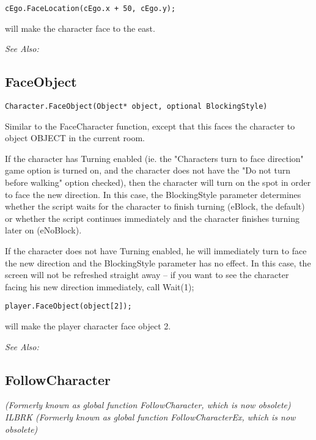 \begin{verbatim}
cEgo.FaceLocation(cEgo.x + 50, cEgo.y);
\end{verbatim}
will make the character face to the east.

\it{See Also:} 


\subsection{FaceObject}\label{Character.FaceObject}%

\begin{verbatim}
Character.FaceObject(Object* object, optional BlockingStyle)
\end{verbatim}
Similar to the FaceCharacter function, except that this faces the character
to object OBJECT in the current room.

If the character has Turning enabled (ie. the "Characters turn to face direction" game
option is turned on, and the character does not have the "Do not turn before walking"
option checked), then the character will turn on the spot in order to face the new direction.
In this case, the BlockingStyle parameter determines whether the script waits for the
character to finish turning (eBlock, the default) or whether the script continues immediately
and the character finishes turning later on (eNoBlock).

If the character does not have Turning enabled, he will immediately turn to face the
new direction and the BlockingStyle parameter has no effect. In this case, the screen
will not be refreshed straight away -- if you want to see the character facing his new direction
immediately, call  Wait(1);

\begin{verbatim}
player.FaceObject(object[2]);
\end{verbatim}
will make the player character face object 2.

\it{See Also:} 


\subsection{FollowCharacter}\label{Character.FollowCharacter}%

\it{(Formerly known as global function FollowCharacter, which is now obsolete)} ILBRK
\it{(Formerly known as global function FollowCharacterEx, which is now obsolete)}

